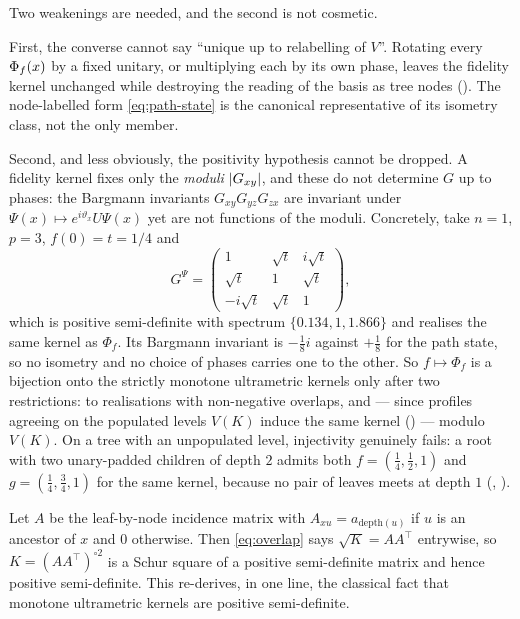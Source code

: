 \begin{remark}
  \label{rem:uniqueness}
  Two weakenings are needed, and the second is not cosmetic.

  First, the converse cannot say ``unique up to relabelling of $V$''. Rotating every
  $\Phi_f(x)$ by a fixed unitary, or multiplying each by its own phase, leaves the
  fidelity kernel unchanged while destroying the reading of the basis as tree nodes
  (). The
  node-labelled form \cref{eq:path-state} is the canonical representative of its
  isometry class, not the only member.

  Second, and less obviously, the positivity hypothesis cannot be dropped. A fidelity
  kernel fixes only the \emph{moduli} $\lvert G_{xy}\rvert$, and these do not determine $G$ up
  to phases: the Bargmann invariants $G_{xy}G_{yz}G_{zx}$ are invariant under
  $\Psi(x) \mapsto e^{i\vartheta_x} U \Psi(x)$ yet are not functions of the moduli.
  Concretely, take $n = 1$, $p = 3$, $f(0) = t = 1/4$ and
  \begin{equation*}
    G^{\Psi} =
    \begin{pmatrix}
      1 & \sqrt{t} & i\sqrt{t} \\
      \sqrt{t} & 1 & \sqrt{t} \\
      -i\sqrt{t} & \sqrt{t} & 1
    \end{pmatrix},
  \end{equation*}
  which is positive semi-definite with spectrum $\{0.134, 1, 1.866\}$ and realises the
  same kernel as $\Phi_f$. Its Bargmann invariant is $-\tfrac{1}{8}i$ against
  $+\tfrac{1}{8}$ for the path state, so no isometry and no choice of phases carries one
  to the other. So $f \mapsto \Phi_f$ is a bijection onto the strictly monotone
  ultrametric kernels only after two restrictions: to realisations with non-negative
  overlaps, and --- since profiles agreeing on the populated levels $V(K)$ induce the
  same kernel () --- modulo $V(K)$. On a tree with an unpopulated
  level, injectivity genuinely fails: a root with two unary-padded children of depth $2$
  admits both $f = (\tfrac14, \tfrac12, 1)$ and $g = (\tfrac14, \tfrac34, 1)$ for the
  same kernel, because no pair of leaves meets at depth $1$
  (,
  ).
\end{remark}

\begin{remark}
  \label{rem:psd}
  Let $A$ be the leaf-by-node incidence matrix with $A_{xu} = a_{\mathrm{depth}(u)}$ if
  $u$ is an ancestor of $x$ and $0$ otherwise. Then \cref{eq:overlap} says
  $\sqrt{K} = A A^{\!\top}$ entrywise, so $K = (A A^{\!\top})^{\circ 2}$ is a Schur
  square of a positive semi-definite matrix and hence positive semi-definite. This
  re-derives, in one line, the classical fact that monotone ultrametric kernels are
  positive semi-definite.
\end{remark}

